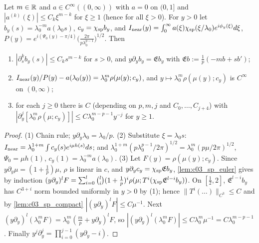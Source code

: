\begin{lemma}
  \label{lem:c03_sp_near}
  Let $m\in\mathbb{R}$ and $a\in C^\infty((0,\infty))$ with $a=0$ on $(0,1]$ and $|a^{(k)}(\xi)|\le C_k\xi^{m-k}$ for $\xi\ge1$ (hence for all $\xi>0$). For $y>0$ let $b_y(s)=\lambda_0^{-m}a(\lambda_0s)$, $c_y=\chi_{\textup{sp}}b_y$, and
  $I_{\textup{near}}(y)=\int_0^\infty a(\xi)\chi_{\textup{sp}}(\xi/\lambda_0)e^{i\phi_y(\xi)}d\xi$, $P(y)=e^{i(\Psi_0(y)-\pi/4)}\bigl(\frac{2\pi}{p\lambda_0^{p-1}}\bigr)^{1/2}$. Then
  \begin{enumerate}
    \item $|\partial_s^kb_y(s)|\le C_ks^{m-k}$ for $s>0$, and $y\partial_yb_y=\mathfrak Eb_y$ with $\mathfrak Eb:=\frac1p(-mb+sb')$;
    \item $I_{\textup{near}}(y)/P(y)-a(\lambda_0(y))=\lambda_0^m\rho(\mu(y);c_y)$, and $y\mapsto\lambda_0^m\rho(\mu(y);c_y)$ is $C^\infty$ on $(0,\infty)$;
    \item for each $j\ge0$ there is $C$ (depending on $p,m,j$ and $C_0,\dots,C_{j+4}$) with $|\partial_y^j[\lambda_0^m\rho(\mu;c_y)]|\le C\lambda_0^{m-p-1}y^{-j}$ for $y\ge1$.
  \end{enumerate}
\end{lemma}
\begin{proof}
  (1) Chain rule; $y\partial_y\lambda_0=\lambda_0/p$.
  (2) Substitute $\xi=\lambda_0s$: $I_{\textup{near}}=\lambda_0^{1+m}\int c_y(s)e^{i\mu h(s)}ds$; and $\lambda_0^{1+m}(p\lambda_0^{p-1}/2\pi)^{1/2}=\lambda_0^m(p\mu/2\pi)^{1/2}$, $\Psi_0=\mu h(1)$, $c_y(1)=\lambda_0^{-m}a(\lambda_0)$.
  (3) Let $F(y)=\rho(\mu(y);c_y)$. Since $y\partial_y\mu=(1+\frac1p)\mu$, $\rho$ is linear in $c$, and $y\partial_yc_y=\chi_{\textup{sp}}\mathfrak Eb_y$, \cref{lem:c03_sp_euler} gives by induction
  $(y\partial_y)^lF=\sum_{i=0}^l\binom li(1+\frac1p)^i\rho(\mu;T^i(\chi_{\textup{sp}}\mathfrak E^{l-i}b_y))$.
  On $[\frac12,2]$, $\mathfrak E^{l-i}b_y$ has $C^{3+i}$ norm bounded uniformly in $y>0$ by (1); hence $\|T^i(\dots)\|_{C^3}\le C$ and by \cref{lem:c03_sp_compact} $|(y\partial_y)^lF|\le C\mu^{-1}$.
  Next $(y\partial_y)^l(\lambda_0^mF)=\lambda_0^m(\frac mp+y\partial_y)^lF$, so $|(y\partial_y)^l(\lambda_0^mF)|\le C\lambda_0^m\mu^{-1}=C\lambda_0^{m-p-1}$.
  Finally $y^j\partial_y^j=\prod_{i=0}^{j-1}(y\partial_y-i)$.
\end{proof}

